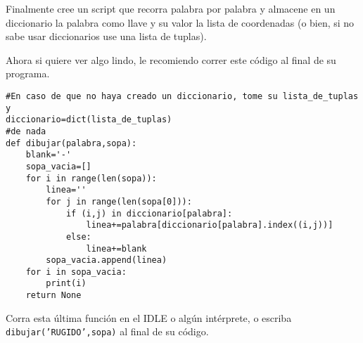 Finalmente cree un script que recorra palabra por palabra y almacene en un diccionario la palabra como llave y su valor la lista de coordenadas (o bien, si no sabe usar diccionarios use una lista de tuplas).

Ahora si quiere ver algo lindo, le recomiendo correr este código al final de su programa.

\begin{lstlisting}[style=consola]
#En caso de que no haya creado un diccionario, tome su lista_de_tuplas y 
diccionario=dict(lista_de_tuplas)
#de nada
def dibujar(palabra,sopa):
    blank='-'
    sopa_vacia=[]
    for i in range(len(sopa)):
        linea=''
        for j in range(len(sopa[0])):
            if (i,j) in diccionario[palabra]:
                linea+=palabra[diccionario[palabra].index((i,j))]
            else:
                linea+=blank
        sopa_vacia.append(linea)
    for i in sopa_vacia:
        print(i)
    return None
\end{lstlisting}

Corra esta última función en el IDLE o algún intérprete, o escriba \texttt{dibujar('RUGIDO',sopa)} al final de su código.